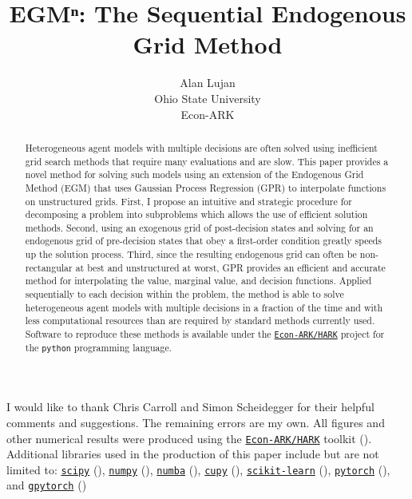\documentclass{article}
\title{EGMⁿ: The Sequential Endogenous Grid Method}
\date{\displaydate{articleDate}}
\author{    Alan Lujan    \footnotemark[1]\\
    Ohio State University\\Econ-ARK\\        }
\begin{document}
    \maketitle

        \begin{abstract}
    Heterogeneous agent models with multiple decisions are often solved using inefficient grid search methods that require many evaluations and are slow.
This paper provides a novel method for solving such models using an extension of the Endogenous Grid Method (EGM) that uses Gaussian Process Regression (GPR) to interpolate functions on unstructured grids.
First, I propose an intuitive and strategic procedure for decomposing a problem into subproblems which allows the use of efficient solution methods.
Second, using an exogenous grid of post-decision states and solving for an endogenous grid of pre-decision states that obey a first-order condition greatly speeds up the solution process.
Third, since the resulting endogenous grid can often be non-rectangular at best and unstructured at worst, GPR provides an efficient and accurate method for interpolating the value, marginal value, and decision functions.
Applied sequentially to each decision within the problem, the method is able to solve heterogeneous agent models with multiple decisions in a fraction of the time and with less computational resources than are required by standard methods currently used.
Software to reproduce these methods is available under the \href{https://econ-ark.org/}{\texttt{Econ-ARK/HARK}} project for the \texttt{python} programming language.
    \end{abstract}


    I would like to thank Chris Carroll and Simon Scheidegger for their helpful comments and suggestions. The remaining errors are my own. All figures and other numerical results were produced using the \href{https://econ-ark.org/}{\texttt{Econ-ARK/HARK}} toolkit (\citet{Carroll2018}). Additional libraries used in the production of this paper include but are not limited to: \href{https://www.scipy.org/}{\texttt{scipy}} (\citet{Virtanen2020}), \href{https://www.numpy.org/}{\texttt{numpy}} (\citet{Harris2020}), \href{https://numba.pydata.org/}{\texttt{numba}} (\citet{Lam2015}), \href{https://cupy.dev/}{\texttt{cupy}} (\citet{Okuta2017}), \href{https://scikit-learn.org/}{\texttt{scikit-learn}} (\citet{Pedregosa2011}), \href{https://pytorch.org/}{\texttt{pytorch}} (\citet{Paszke2019}), and \href{https://gpytorch.ai/}{\texttt{gpytorch}} (\citet{Gardner2018})
\end{document}
